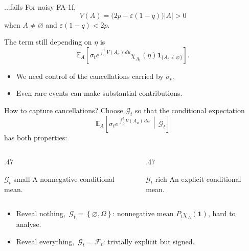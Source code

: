 \documentclass[t,aspectratio=169,11pt]{beamer}
\newcommand{\E}{\mathbb E}
\newcommand{\ind}{\mathbf1}
\newcommand{\one}{\mathbf1}
\newcommand{\cb}[1]{\left\{#1\right\}}
\newcommand{\abs}[1]{\left|#1\right|}
\newenvironment{talkpoints}{\begin{itemize}\setlength{\itemsep}{.65em}}{\end{itemize}}
\begin{document}
\begin{frame}[label=duality-obstruction]{...fails}
For noisy FA-1f,
\begin{equation*}
V(A)=\bigl(2p-\varepsilon(1-q)\bigr)\abs A>0
\end{equation*}
when $A\neq\varnothing$ and $\varepsilon(1-q)<2p$.
\par\bigskip
The term still depending on $\eta$ is
\begin{equation*}
\E_A\!\left[
\sigma_t e^{\int_0^t V(A_u)\,du}\chi_{A_t}(\eta)
\ind_{\{A_t\neq\varnothing\}}
\right].
\end{equation*}
\medskip
\begin{talkpoints}
\item We need control of the cancellations carried by $\sigma_t$.
\item Even rare events can make substantial contributions.
\end{talkpoints}
\note{\DualityObstructionScript}
\end{frame}

\begin{frame}[label=patches-conditioning]{How to capture cancellations?}
Choose $\mathcal G_t$ so that the conditional expectation
\begin{equation*}
\E_A\!\left[\sigma_t e^{\int_0^t V(A_u)\,du}\,\middle|\,\mathcal G_t\right]
\end{equation*}
has both properties:
\medskip
\begin{columns}[T,onlytextwidth]
\begin{column}{.47\textwidth}
\begin{block}{$\mathcal{G}_t$ small}
A nonnegative conditional mean.
\end{block}
\end{column}
\begin{column}{.47\textwidth}
\begin{block}{$\mathcal{G}_t$ rich}
An explicit conditional mean.
\end{block}
\end{column}
\end{columns}
\bigskip
\begin{talkpoints}
\item Reveal nothing,~$\mathcal{G}_t = \cb{\varnothing,\Omega}$: nonnegative mean $P_t\chi_A(\one)$, hard to analyse.
\item Reveal everything,~$\mathcal{G}_t=\mathcal{F}_t$: trivially explicit but signed.
\end{talkpoints}
\note{\PatchesConditioningScript}
\end{frame}
\end{document}
